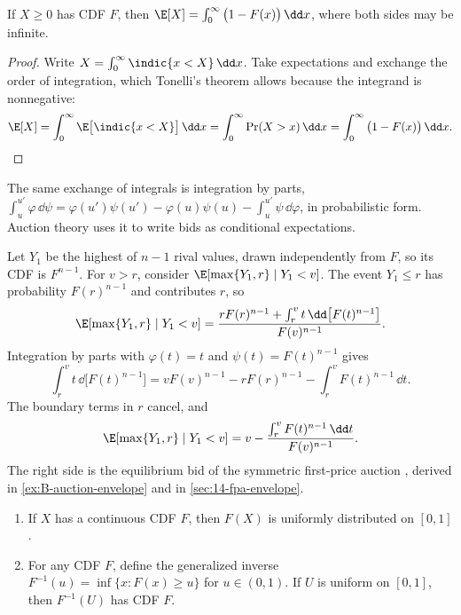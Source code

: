 \begin{lemma}\label{lem:B-tail}
If $X \geq 0$ has CDF $F$, then $\E[X] = \int_0^\infty\big(1 - F(x)\big)\,\dd x$, where both sides may be infinite.
\end{lemma}

\begin{proof}
Write $X = \int_0^\infty\indic\{x < X\}\,\dd x$. Take expectations and exchange the order of integration, which
Tonelli's theorem allows because the integrand is nonnegative:
\begin{equation*}
\E[X] = \int_0^\infty\E\big[\indic\{x < X\}\big]\,\dd x = \int_0^\infty\Pr(X > x)\,\dd x = \int_0^\infty\big(1 - F(x)\big)\,\dd x .
\qedhere
\end{equation*}
\end{proof}

The same exchange of integrals is integration by parts,
$\int_u^{u'}\varphi\,\dd\psi = \varphi(u')\psi(u') - \varphi(u)\psi(u) - \int_u^{u'}\psi\,\dd\varphi$, in probabilistic form. Auction
theory uses it to write bids as conditional expectations.

\begin{example}\label{ex:B-rs-parts}
Let $Y_1$ be the highest of $n - 1$ rival values, drawn independently from $F$, so its CDF is $F^{n - 1}$. For $v > r$,
consider $\E[\max\{Y_1, r\} \mid Y_1 < v]$. The event $Y_1 \leq r$ has probability $F(r)^{n - 1}$ and contributes $r$, so
\begin{equation*}
\E[\max\{Y_1, r\} \mid Y_1 < v] = \frac{rF(r)^{n - 1} + \int_r^v t\,\dd\big[F(t)^{n - 1}\big]}{F(v)^{n - 1}} .
\end{equation*}
Integration by parts with $\varphi(t) = t$ and $\psi(t) = F(t)^{n - 1}$ gives
\begin{equation*}
\int_r^v t\,\dd\big[F(t)^{n - 1}\big] = vF(v)^{n - 1} - rF(r)^{n - 1} - \int_r^vF(t)^{n - 1}\,\dd t .
\end{equation*}
The boundary terms in $r$ cancel, and
\begin{equation}\label{eq:B-rs-bid}
\E[\max\{Y_1, r\} \mid Y_1 < v] = v - \frac{\int_r^v F(t)^{n - 1}\,\dd t}{F(v)^{n - 1}} .
\end{equation}
The right side is the equilibrium bid of the symmetric first-price auction \citep{RileySamuelson1981}, derived in
\cref{ex:B-auction-envelope} and in \cref{sec:14-fpa-envelope}.
\end{example}

\begin{lemma}\label{lem:B-pit}
\begin{enumerate}[label=(\alph*)]
  \item If $X$ has a continuous CDF $F$, then $F(X)$ is uniformly distributed on $[0, 1]$.
  \item For any CDF $F$, define the generalized inverse $F^{-1}(u) = \inf\{x : F(x) \geq u\}$ for $u \in (0, 1)$. If
  $U$ is uniform on $[0, 1]$, then $F^{-1}(U)$ has CDF $F$.
\end{enumerate}
\end{lemma}

